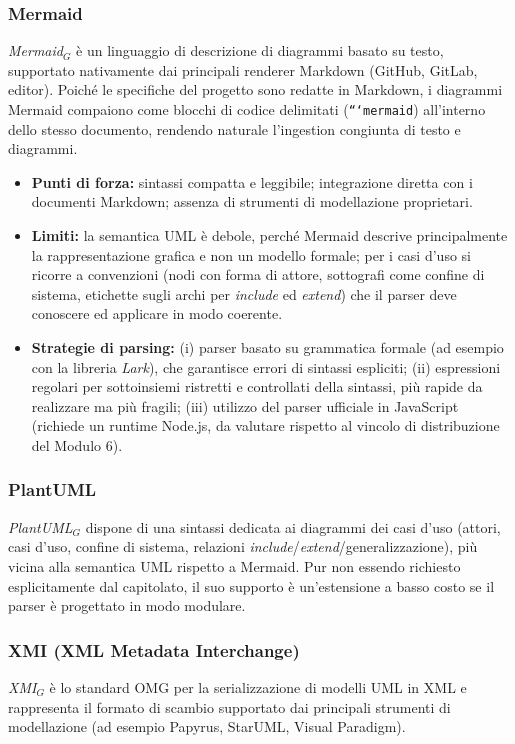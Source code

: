 \documentclass[a4paper, 11pt]{article}
\newcommand{\term}[1]{\textit{#1}$_G$} %
\begin{document}
\subsubsection{Mermaid}
\term{Mermaid} è un linguaggio di descrizione di diagrammi basato su testo, supportato nativamente dai principali renderer Markdown (GitHub, GitLab, editor). Poiché le specifiche del progetto sono redatte in Markdown, i diagrammi Mermaid compaiono come blocchi di codice delimitati (\texttt{```mermaid}) all'interno dello stesso documento, rendendo naturale l'ingestion congiunta di testo e diagrammi.

\begin{itemize}
    \item \textbf{Punti di forza:} sintassi compatta e leggibile; integrazione diretta con i documenti Markdown; assenza di strumenti di modellazione proprietari.
    \item \textbf{Limiti:} la semantica UML è debole, perché Mermaid descrive principalmente la rappresentazione grafica e non un modello formale; per i casi d'uso si ricorre a convenzioni (nodi con forma di attore, sottografi come confine di sistema, etichette sugli archi per \textit{include} ed \textit{extend}) che il parser deve conoscere ed applicare in modo coerente.
    \item \textbf{Strategie di parsing:} (i) parser basato su grammatica formale (ad esempio con la libreria \textit{Lark}), che garantisce errori di sintassi espliciti; (ii) espressioni regolari per sottoinsiemi ristretti e controllati della sintassi, più rapide da realizzare ma più fragili; (iii) utilizzo del parser ufficiale in JavaScript (richiede un runtime Node.js, da valutare rispetto al vincolo di distribuzione del Modulo 6).
\end{itemize}

\subsubsection{PlantUML}
\term{PlantUML} dispone di una sintassi dedicata ai diagrammi dei casi d'uso (attori, casi d'uso, confine di sistema, relazioni \textit{include}/\textit{extend}/generalizzazione), più vicina alla semantica UML rispetto a Mermaid. Pur non essendo richiesto esplicitamente dal capitolato, il suo supporto è un'estensione a basso costo se il parser è progettato in modo modulare.

\subsubsection{XMI (XML Metadata Interchange)}
\term{XMI} è lo standard OMG per la serializzazione di modelli UML in XML e rappresenta il formato di scambio supportato dai principali strumenti di modellazione (ad esempio Papyrus, StarUML, Visual Paradigm).
\end{document}
